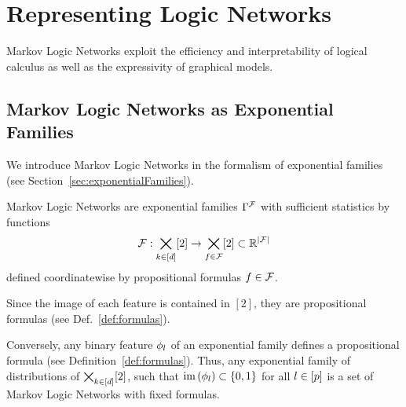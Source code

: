 \section{Representing Logic Networks}

Markov Logic Networks exploit the efficiency and interpretability of logical calculus as well as the expressivity of graphical models. 




\subsection{Markov Logic Networks as Exponential Families}

We introduce Markov Logic Networks in the formalism of exponential families (see Section~\ref{sec:exponentialFamilies}).

\begin{definition}
	Markov Logic Networks are exponential families $\Gamma^{\mathcal{F}}$ with sufficient statistics by functions
		\[ \mathcal{F} : \bigtimes_{k\in[d]}[2] \rightarrow \bigtimes_{f\in\mathcal{F}}[2] \subset \mathbb{R}^{\left|\mathcal{F}\right|} \]
	defined coordinatewise by propositional formulas $f\in\mathcal{F}$.
\end{definition}

Since the image of each feature is contained in $[2]$, they are propositional formulas (see Def.~\ref{def:formulas}).

Conversely, any binary feature $\phi_{l}$ of an exponential family defines a propositional formula (see Definition~\ref{def:formulas}).
Thus, any exponential family of distributions of $\bigtimes_{k\in[d]}[2]$, such that $\mathrm{im}\left(\phi_{l}\right)\subset\{0,1\}$ for all $l\in[p]$ is a set of Markov Logic Networks with fixed formulas.

